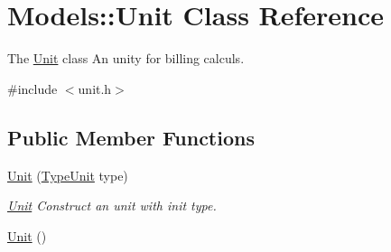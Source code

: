 \hypertarget{classModels_1_1Unit}{\section{Models\-:\-:Unit Class Reference}
\label{classModels_1_1Unit}
}


The \hyperlink{classModels_1_1Unit}{Unit} class An unity for billing calculs.  




{\ttfamily \#include $<$unit.\-h$>$}

\subsection*{Public Member Functions}
\begin{DoxyCompactItemize}
\item 
\hyperlink{classModels_1_1Unit_ab6dc4f5dd689927604f3ac168f3c1552}{Unit} (\hyperlink{namespaceModels_a999532b323a4b63ff54013326c83f040}{Type\-Unit} type)
\begin{DoxyCompactList}\small\item\em \hyperlink{classModels_1_1Unit}{Unit} Construct an unit with init type. \end{DoxyCompactList}\item 
\hypertarget{classModels_1_1Unit_a34e1eddc3b72967266106fa506fb583c}{\hyperlink{classModels_1_1Unit_a34e1eddc3b72967266106fa506fb583c}{Unit} ()}\label{classModels_1_1Unit_a34e1eddc3b72967266106fa506fb583c}


\end{DoxyCompactItemize}

